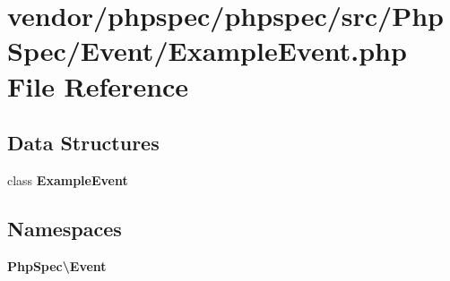 \section{vendor/phpspec/phpspec/src/\+Php\+Spec/\+Event/\+Example\+Event.php File Reference}
\label{_example_event_8php}
\subsection*{Data Structures}
\begin{DoxyCompactItemize}
\item 
class {\bf Example\+Event}
\end{DoxyCompactItemize}
\subsection*{Namespaces}
\begin{DoxyCompactItemize}
\item 
 {\bf Php\+Spec\textbackslash{}\+Event}
\end{DoxyCompactItemize}
